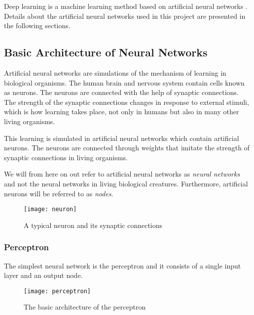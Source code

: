 \documentclass[titlepage]{article}
\begin{document}
\vskip 0.2cm

Deep learning is a machine learning method based on artificial neural networks \cite{deeplearning}. Details about the artificial neural networks used in this project are presented in the following sections. 

\subsection{Basic Architecture of Neural Networks}

\vskip 0.2cm

Artificial neural networks \cite{charu} are simulations of the mechanism of learning in biological organisms. The human brain and nervous system contain cells known as neurons. The neurons are connected with the help of synaptic connections. The strength of the synaptic connections changes in response to external stimuli, which is how learning takes place, not only in humans but also in many other living organisms. 

\vskip 0.3cm

\noindent
This learning is simulated in artificial neural networks \cite{charu} which contain artificial neurons. The neurons are connected through weights that imitate the strength of synaptic connections in living organisms.

\vskip 0.3cm

\noindent
We will from here on out refer to artificial neural networks as \emph{neural networks} and not the neural networks in living biological creatures. Furthermore, artificial neurons will be referred to as \emph{nodes}.

\vskip 0.5cm

\begin{figure}[h]
    \centering
    \texttt{[image: neuron]}
    \caption{A typical neuron and its synaptic connections}
\end{figure}

\subsubsection{Perceptron}

\vskip 0.2cm

The simplest neural network is the perceptron \cite{charu} and it consists of a single input layer and an output node. 

\begin{figure}[h]
    \centering
    \texttt{[image: perceptron]}
    \caption{The basic architecture of the perceptron}
\end{figure}
\end{document}
